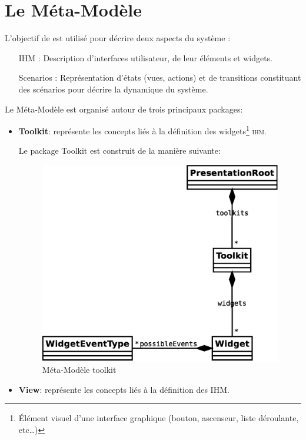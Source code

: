 \section{Le Méta-Modèle \kwcinematic{}}

L'objectif de \kwcinematic{} est utilisé pour décrire deux aspects du système :
\begin{itemize}
\item[IHM :] Description d'interfaces utilisateur, de leur éléments et widgets.
\item[Scenarios :] Représentation d'états (vues, actions) et de transitions constituant des scénarios pour décrire la dynamique du système.
\end{itemize}

Le Méta-Modèle \kwcinematic{} est organisé autour de trois principaux packages:
\begin{itemize}
  \item \textbf{Toolkit}: représente les concepts liés à la définition des widgets\footnote{Élément visuel d'une interface graphique (bouton, ascenseur, liste déroulante, etc\dots)} \textsc{ihm}.

Le package Toolkit est construit de la manière suivante:

\begin{figure}[htb]
  \centering
  \includegraphics[scale=.3]{img/toolkit.eps}
  \caption{Méta-Modèle toolkit}
  \label{fig:toolkit}
\end{figure}
  \item \textbf{View}: représente les concepts liés à la définition des  \textsc{IHM}.


\end{itemize}

